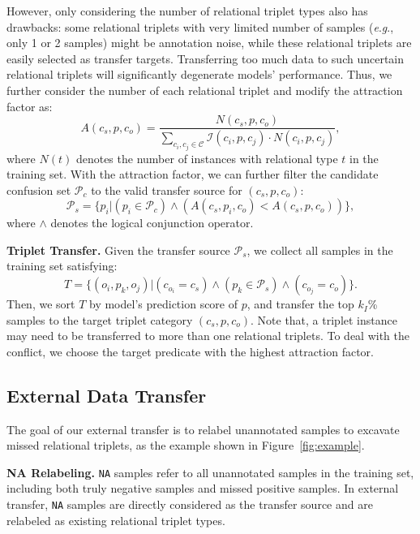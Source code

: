 \documentclass[runningheads]{llncs}
\newcommand{\eg}{\textit{e}.\textit{g}.}
\begin{document}
However, only considering the number of relational triplet types also has drawbacks: 
some relational triplets with very limited number of samples (\eg, only 1 or 2 samples) might be annotation noise, while these relational triplets are easily selected as transfer targets.
Transferring too much data to such uncertain relational triplets will significantly degenerate models' performance.
Thus, we further consider the number of each relational triplet and modify the attraction factor as:
\begin{equation}
    A(c_s, p, c_o) = \frac{N(c_s, p, c_o)}{\sum_{c_i, c_j \in \mathcal{C}}{\mathcal{I}(c_i, p, c_j) \cdot N(c_i, p, c_j) }},
\end{equation}
where $N(t)$ denotes the number of instances with relational type $t$ in the training set.
With the attraction factor, we can further filter the candidate confusion set $\mathcal{P}_c$ to the valid transfer source for $(c_s, p, c_o)$: 
\begin{equation}
    \mathcal{P}_s=\{p_i| (p_i \in \mathcal{P}_c) \wedge (A(c_s, p_i, c_o) < A(c_s, p, c_o)) \},
\end{equation}
where $\wedge$ denotes the logical conjunction operator.

\smallskip
\noindent
\textbf{Triplet Transfer.}
Given the transfer source $\mathcal{P}_s$, we collect all samples in the training set satisfying:
\begin{equation}
    T= \{(o_i, p_k, o_j) | (c_{o_i}=c_s) \wedge (p_k \in \mathcal{P}_s) \wedge (c_{o_j}=c_o) \}.
\end{equation}
Then, we sort $T$ by model's prediction score of $p$, and transfer the top $k_I$\% samples to the target triplet category $(c_s, p, c_o)$.
Note that, a triplet instance may need to be transferred to more than one relational triplets.
To deal with the conflict, we choose the target predicate with the highest attraction factor.

\subsection{External Data Transfer}
The goal of our external transfer is to relabel unannotated samples to excavate missed relational triplets, as the example shown in Figure~\ref{fig:example}.

\smallskip
\noindent
\textbf{NA Relabeling.}
\texttt{NA} samples refer to all unannotated samples in the training set, including both truly negative samples and missed positive samples.
In external transfer, \texttt{NA} samples are directly considered as the transfer source and are relabeled as existing relational triplet types.
\end{document}
